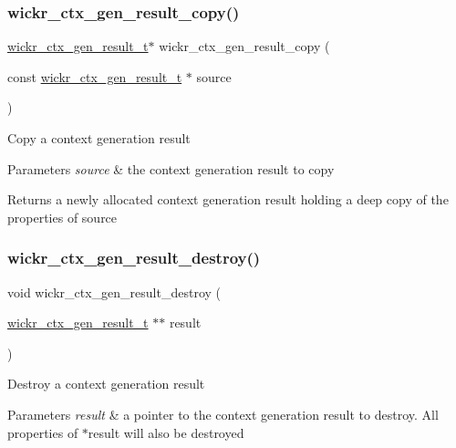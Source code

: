 \subsubsection{\texorpdfstring{wickr\+\_\+ctx\+\_\+gen\+\_\+result\+\_\+copy()}{wickr\_ctx\_gen\_result\_copy()}}
{\footnotesize\ttfamily \mbox{\hyperlink{structwickr__ctx__gen__result}{wickr\+\_\+ctx\+\_\+gen\+\_\+result\+\_\+t}}$\ast$ wickr\+\_\+ctx\+\_\+gen\+\_\+result\+\_\+copy (\begin{DoxyParamCaption}\item[{const \mbox{\hyperlink{structwickr__ctx__gen__result}{wickr\+\_\+ctx\+\_\+gen\+\_\+result\+\_\+t}} $\ast$}]{source }\end{DoxyParamCaption})}

Copy a context generation result


\begin{DoxyParams}{Parameters}
{\em source} & the context generation result to copy \\
\hline
\end{DoxyParams}
\begin{DoxyReturn}{Returns}
a newly allocated context generation result holding a deep copy of the properties of \textquotesingle{}source\textquotesingle{} 
\end{DoxyReturn}
\mbox{\label{group__wickr__ctx_ga865854408d22e4697eebe5bc129cc6b1}} 
\subsubsection{\texorpdfstring{wickr\+\_\+ctx\+\_\+gen\+\_\+result\+\_\+destroy()}{wickr\_ctx\_gen\_result\_destroy()}}
{\footnotesize\ttfamily void wickr\+\_\+ctx\+\_\+gen\+\_\+result\+\_\+destroy (\begin{DoxyParamCaption}\item[{\mbox{\hyperlink{structwickr__ctx__gen__result}{wickr\+\_\+ctx\+\_\+gen\+\_\+result\+\_\+t}} $\ast$$\ast$}]{result }\end{DoxyParamCaption})}

Destroy a context generation result


\begin{DoxyParams}{Parameters}
{\em result} & a pointer to the context generation result to destroy. All properties of \textquotesingle{}$\ast$result\textquotesingle{} will also be destroyed \\
\hline
\end{DoxyParams}
\mbox{\label{group__wickr__ctx_gaa32727731391f1e3fbde26094924b533}} 
